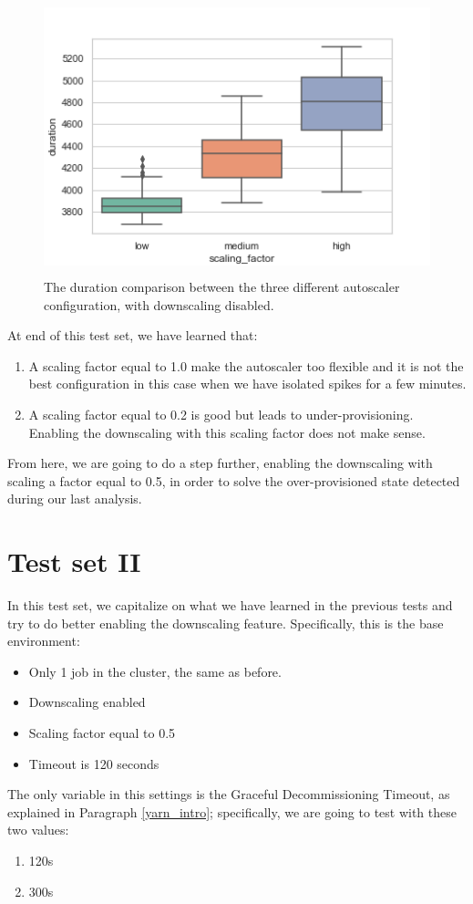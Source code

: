 \documentclass[12pt,twoside,cucitura]{toptesi}
\begin{document}
\begin{figure}
\centering
\includegraphics[height=80mm]{test1-duration-comparison}
\caption{The duration comparison between the three different autoscaler configuration, with downscaling disabled.}\label{fig:test1-duration-comparison}
\end{figure}

At end of this test set, we have learned that:
\begin{enumerate}
	\item A scaling factor equal to 1.0 make the autoscaler too flexible and it is not the best configuration in this case when we have isolated spikes for a few minutes.
	\item A scaling factor equal to 0.2 is good but leads to under-provisioning. Enabling the downscaling with this scaling factor does not make sense.
\end{enumerate}

From here, we are going to do a step further, enabling the downscaling with scaling a factor equal to 0.5, in order to solve the over-provisioned state detected during our last analysis.

\section{Test set II} \label{test-set-ii}
In this test set, we capitalize on what we have learned in the previous tests and try to do better enabling the downscaling feature. Specifically, this is the base environment:
\begin{itemize}
	\item Only 1 job in the cluster, the same as before.
	\item Downscaling enabled
	\item Scaling factor equal to 0.5
	\item Timeout is 120 seconds
\end{itemize}
The only variable in this settings is the Graceful Decommissioning Timeout, as explained in Paragraph \ref{yarn_intro}; specifically, we are going to test with these two values:
\begin{enumerate}
	\item 120s
	\item 300s
\end{enumerate}
\end{document}
